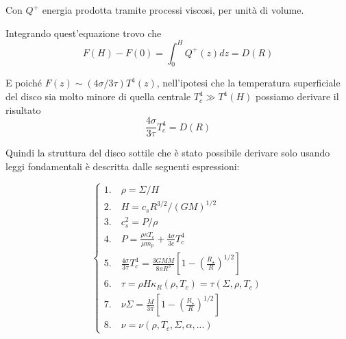 \documentclass[a4paperbi]{article}
\begin{document}
	Con $Q^+$ energia prodotta tramite processi viscosi, per unità di volume.
	
	Integrando quest'equazione trovo che
	\begin{equation}
		F(H)-F(0)=\int_0^HQ^+(z)dz=D(R)
	\end{equation}

	E poiché $F(z)\sim(4\sigma/3\tau)T^4(z)$, nell'ipotesi che la temperatura superficiale del disco sia molto minore di quella centrale $T_c^4\gg T^4(H)$
	possiamo derivare il risultato
	\begin{equation}
		\frac{4\sigma}{3\tau}T^4_c=D(R)
	\end{equation}
	
	\newpage
	Quindi la struttura del disco sottile che è stato possibile derivare solo usando leggi fondamentali è descritta dalle seguenti espressioni:
	
	\begin{spacing}{1.3}
	\begin{equation}\label{eq:SistemaStazionario}
	\begin{cases}
		1.\quad \rho=\Sigma/H\\
		2.\quad H=c_sR^{3/2}/(GM)^{1/2}\\
		3.\quad c_s^2=P/\rho\\
		4.\quad P=\frac{\rho\kappa T_c}{\mu m_p}+\frac{4\sigma}{3c}T_c^4\\
		5.\quad \frac{4\sigma}{3\tau}T^4_c=\frac{3GM\dot{M}}{8\pi R^3}\left[1-\left(\frac{R_{\star}}{R}\right)^{1/2}\right]\\
		6.\quad \tau=\rho H\kappa_R(\rho,T_c)=\tau(\Sigma,\rho,T_c)\\
		7.\quad \nu\Sigma=\frac{\dot{M}}{3\pi}\left[1-\left(\frac{R_{\star}}{R}\right)^{1/2}\right]\\
		8.\quad \nu=\nu(\rho,T_c,\Sigma,\alpha,...)		
	\end{cases}
	\end{equation}
	\end{spacing}
		
\end{document}
